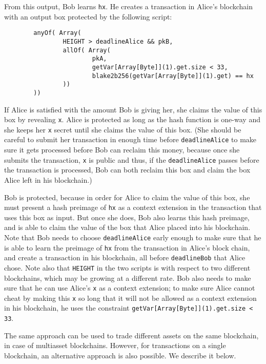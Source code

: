 \documentclass[11pt]{article}
\begin{document}
From this output, Bob learns \texttt{hx}. He creates a transaction in Alice's blockchain with an output box protected by the following script:
\begin{verbatim}
        anyOf( Array(
                HEIGHT > deadlineAlice && pkB,
                allOf( Array( 
                        pkA,
                        getVar[Array[Byte]](1).get.size < 33,
                        blake2b256(getVar[Array[Byte]](1).get) == hx
                ))
        ))
\end{verbatim}

If Alice is satisfied with the amount Bob is giving her, she claims the value of this box by revealing \texttt{x}. Alice is protected as long as the hash function is one-way and she keeps her \texttt{x} secret until she claims the value of this box. (She should be careful to submit her transaction in enough time before \texttt{deadlineAlice} to make sure it gets processed before Bob can reclaim this money, because once she submits the transaction, \texttt{x} is public and thus, if the \texttt{deadlineAlice} passes before the transaction is processed, Bob can both reclaim this box and claim the box Alice left in his blockchain.)

Bob is protected, because in order for Alice to claim the value of this box, she must present a hash preimage of \texttt{hx} as a context extension in the transaction that uses this box as input. But once she does, Bob also learns this hash preimage, and is able to claim the value of the box that Alice placed into his blockchain. Note that Bob needs to choose \texttt{deadlineAlice} early enough to make sure that he is able to learn the preimage of \texttt{hx} from the transaction in Alice's block chain, and create a transaction in his blockchain, all before \texttt{deadlineBob} that Alice chose. Note also that \texttt{HEIGHT} in the two scripts is with respect to two different blockchains, which may be growing at a different rate. Bob also needs to make sure that he can use Alice's \texttt{x} as a context extension; to make sure Alice cannot cheat by making this \texttt{x} so long that it will not be allowed as a context extension in his blockchain, he uses the constraint \texttt{getVar[Array[Byte]](1).get.size < 33}.

The same approach can be used to trade different assets on the same blockchain, in case of multiasset blockchains. However, for transactions on a single blockchain, an alternative approach is also possible. We describe it below.
\end{document}
